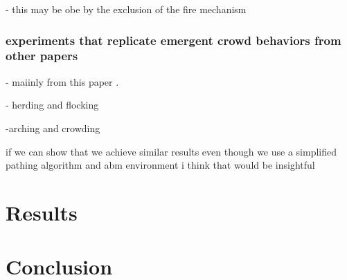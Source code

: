 \documentclass[12pt,letterpaper]{article}
\begin{document}
-  this may be obe by the exclusion of the fire mechanism

\subsubsection{experiments that replicate emergent crowd behaviors from other papers}
- maiinly from this paper \cite{almeidaCrowdSimulationModeling2013}  .  

- herding and flocking

-arching and crowding

if we can show that we achieve similar results even though we use a simplified pathing algorithm and abm environment i think that would be insightful


\section{Results}



\section {Conclusion}



\end{document}
